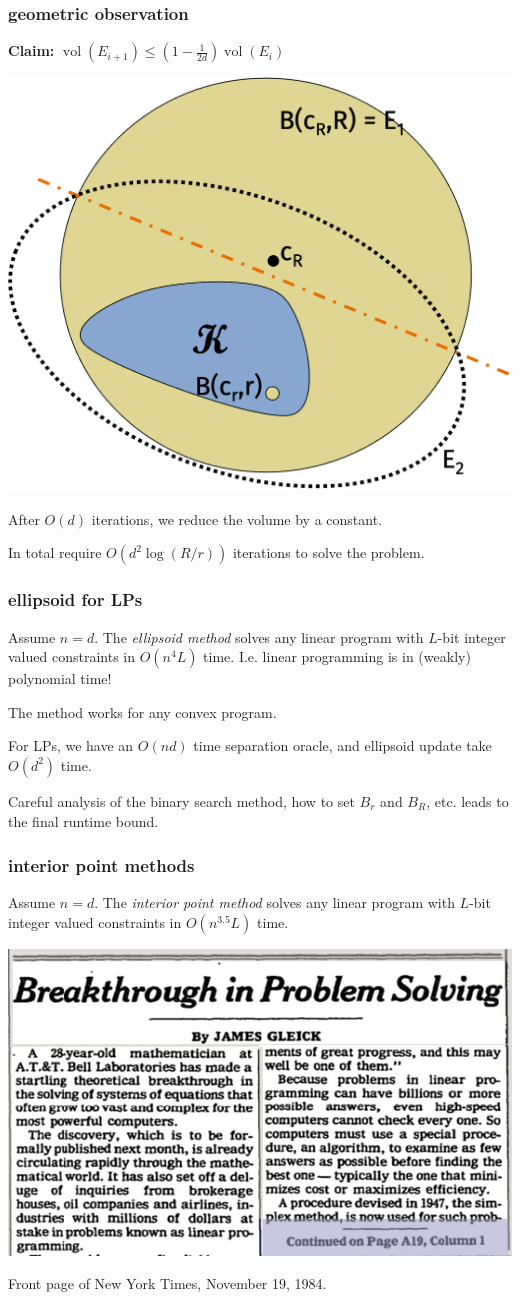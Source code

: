 \documentclass[compress]{beamer}
\DeclareMathOperator{\vol}{vol}
\begin{document}
\begin{frame}[t]
	\frametitle{geometric observation}
	\textbf{Claim:} $\vol(E_{i+1}) \leq (1-\frac{1}{2d})\vol(E_i)$

	\begin{center}
		\includegraphics[width=.5\textwidth]{ellipsoid2.png}
	\end{center}
	\begin{center}
		After $O(d)$ iterations, we reduce the volume by a constant.
		
		In total require $O(d^2\log(R/r))$ iterations to solve the problem.
	\end{center}
\end{frame}

\begin{frame}[t]
	\frametitle{ellipsoid for LPs}
	\begin{theorem}[Khachiyan, 1979]
		Assume $n=d$. The \emph{ellipsoid method} solves any linear program with $L$-bit integer valued constraints in $O(n^4L)$ time. I.e. linear programming is in (weakly) polynomial time!
	\end{theorem}
The method works for any convex program. 

For LPs, we have an $O(nd)$ time separation oracle, and ellipsoid update take $O(d^2)$ time.

 Careful analysis of the binary search method, how to set $B_r$ and $B_R$, etc. leads to the final runtime bound. 
\end{frame}

\begin{frame}[t]
	\frametitle{interior point methods}
	\begin{theorem}[Karmarkar, 1984]
		Assume $n=d$. The \emph{interior point method} solves any linear program with $L$-bit integer valued constraints in $O(n^{3.5}L)$ time. 
	\end{theorem}
	\begin{center}
	\includegraphics[width=.7\textwidth]{interiornews.png}
	
			Front page of New York Times, November 19, 1984.
	\end{center}
\end{frame}
\end{document}
